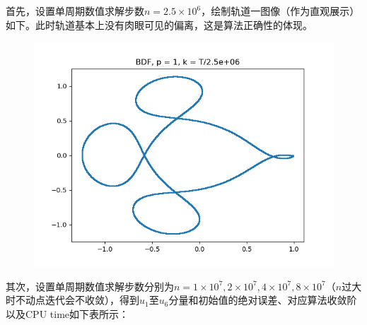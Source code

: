 \documentclass{ctexart}
\begin{document}
\begin{sloppypar}
首先，设置单周期数值求解步数$n = 2.5 \times 10^6$，绘制轨道一图像（作为直观展示）如下。此时轨道基本上没有肉眼可见的偏离，这是算法正确性的体现。
\begin{figure}[H]
\centering
\includegraphics[scale = 0.45]{./report_src/Figure_17.png}
\end{figure}
其次，设置单周期数值求解步数分别为$n = 1 \times 10^7,2 \times 10^7,4 \times 10^7, 8 \times 10^7$（$n$过大时不动点迭代会不收敛），得到$u_1$至$u_6$分量和初始值的绝对误差、对应算法收敛阶以及CPU time如下表所示：


\end{sloppypar}
\end{document}
